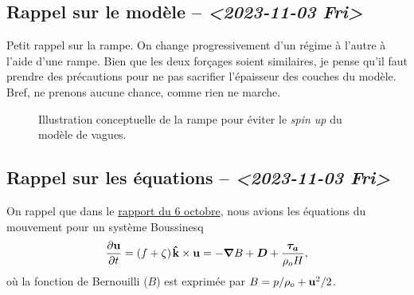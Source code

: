 \documentclass[10pt]{article}
\numberwithin{equation}{section}
\newcommand{\kvf}{\vb{\hat{k}}}
\newcommand{\uu}{\vb{u}}
\newcommand{\pt}{\hspace{1pt}} %
\begin{document}
\subsection{Rappel sur le modèle -- \textit{<2023-11-03 Fri>}}
\label{sec:org7de4020}

Petit rappel sur la rampe.
On change progressivement d'un régime à l'autre à l'aide d'une rampe.
Bien que les deux forçages soient similaires, je pense qu'il faut prendre des précautions pour ne pas sacrifier l'épaisseur des couches du modèle.
Bref, ne prenons aucune chance, comme rien ne marche.

\begin{figure}
\begin{center}
\end{center}
\caption{\label{org14bfb3e}Illustration conceptuelle de la rampe pour éviter le \emph{spin up} du modèle de vagues.}
\end{figure}
\subsection{Rappel sur les équations -- \textit{<2023-11-03 Fri>}}
\label{sec:orgf06fd4e}

On rappel que dans le \href{rapport-2023-10-06.org}{rapport du 6 octobre}, nous avions les équations du mouvement pour un système Boussinesq
\begin{equation}
\label{eq:org4785b03}
   \pdv{\uu}{t} = \qty(f+\zeta)\pt \kvf\times\uu = -\gradient{B} + \boldsymbol{D} + \frac{\boldsymbol{\tau_a}}{\rho_o H},
\end{equation}
où la fonction de Bernouilli (\(B\)) est exprimée par \(B = p/\rho_o + \uu^2/2\).\bigskip
\end{document}
